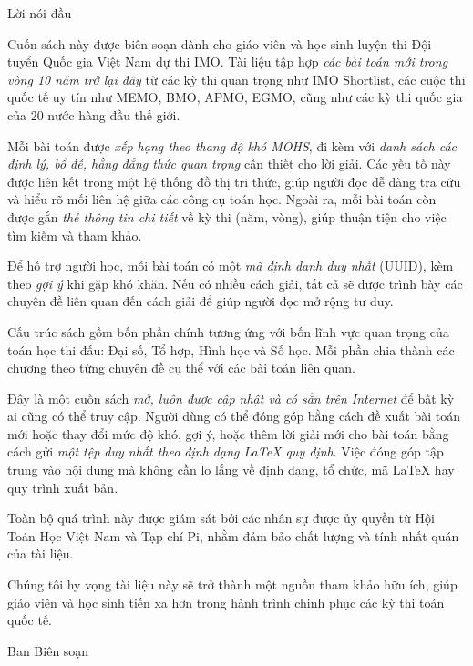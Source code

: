\documentclass[../imo-training-open-book.tex]{subfiles}
\begin{document}
Lời nói đầu

Cuốn sách này được biên soạn dành cho giáo viên và học sinh luyện thi Đội tuyển Quốc gia Việt Nam dự thi IMO.
Tài liệu tập hợp \textit{các bài toán mới trong vòng 10 năm trở lại đây} từ các kỳ thi quan trọng như IMO Shortlist,
các cuộc thi quốc tế uy tín như MEMO, BMO, APMO, EGMO, cũng như các kỳ thi quốc gia của 20 nước hàng đầu thế giới.

Mỗi bài toán được \textit{xếp hạng theo thang độ khó MOHS}, đi kèm với \textit{danh sách các định lý, bổ đề, hằng đẳng thức quan trọng} cần thiết cho lời giải.
Các yếu tố này được liên kết trong một hệ thống đồ thị tri thức, giúp người đọc dễ dàng tra cứu và hiểu rõ mối liên hệ giữa các công cụ toán học.
Ngoài ra, mỗi bài toán còn được gắn \textit{thẻ thông tin chi tiết} về kỳ thi (năm, vòng), giúp thuận tiện cho việc tìm kiếm và tham khảo.

Để hỗ trợ người học, mỗi bài toán có một \textit{mã định danh duy nhất} (UUID), kèm theo \textit{gợi ý} khi gặp khó khăn.
Nếu có nhiều cách giải, tất cả sẽ được trình bày các chuyên đề liên quan đến cách giải để giúp người đọc mở rộng tư duy.

Cấu trúc sách gồm bốn phần chính tương ứng với bốn lĩnh vực quan trọng của toán học thi đấu: Đại số, Tổ hợp, Hình học và Số học.
Mỗi phần chia thành các chương theo từng chuyên đề cụ thể với các bài toán liên quan.

Đây là một cuốn sách \textit{mở, luôn được cập nhật và có sẵn trên Internet} để bất kỳ ai cũng có thể truy cập.
Người dùng có thể đóng góp bằng cách đề xuất bài toán mới hoặc thay đổi mức độ khó, gợi ý,
hoặc thêm lời giải mới cho bài toán bằng cách gửi \textit{một tệp duy nhất theo định dạng LaTeX quy định}.
Việc đóng góp tập trung vào nội dung mà không cần lo lắng về định dạng, tổ chức, mã LaTeX hay quy trình xuất bản.

Toàn bộ quá trình này được giám sát bởi các nhân sự được ủy quyền từ Hội Toán Học Việt Nam và Tạp chí Pi,
nhằm đảm bảo chất lượng và tính nhất quán của tài liệu.

Chúng tôi hy vọng tài liệu này sẽ trở thành một nguồn tham khảo hữu ích,
giúp giáo viên và học sinh tiến xa hơn trong hành trình chinh phục các kỳ thi toán quốc tế.

\flushright Ban Biên soạn
\end{document}
